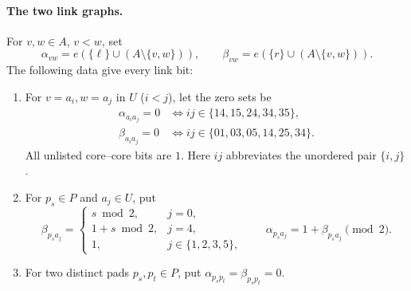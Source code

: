 \documentclass[11pt,a4paper]{article}
\theoremstyle{remark}
\begin{document}
\paragraph{The two link graphs.}
For $v,w\in A$, $v<w$, set
\[
 \alpha_{vw}=e(\{\ell\}\cup(A\setminus\{v,w\})),
 \qquad
 \beta_{vw}=e(\{r\}\cup(A\setminus\{v,w\})).
\]
The following data give every link bit:
\begin{enumerate}
\item For $v=a_i,w=a_j$ in $U$ ($i<j$), let the zero sets be
\begin{align}\label{eq:oldedges}
  \alpha_{a_i a_j}=0&\iff ij\in\{14,15,24,34,35\},\\
  \beta_{a_i a_j}=0&\iff ij\in\{01,03,05,14,25,34\}.
\end{align}
All unlisted core--core bits are $1$. Here $ij$ abbreviates the
unordered pair $\{i,j\}$.
\item For $p_s\in P$ and $a_j\in U$, put
\begin{equation}\label{eq:paddededges}
 \beta_{p_s a_j}=
 \begin{cases}
  s\bmod2,&j=0,\\
  1+s\bmod2,&j=4,\\
  1,&j\in\{1,2,3,5\},
 \end{cases}
 \qquad
 \alpha_{p_s a_j}=1+\beta_{p_s a_j}\pmod2.
\end{equation}
\item For two distinct pads $p_s,p_t\in P$, put
$\alpha_{p_sp_t}=\beta_{p_sp_t}=0$.
\end{enumerate}
\end{document}
